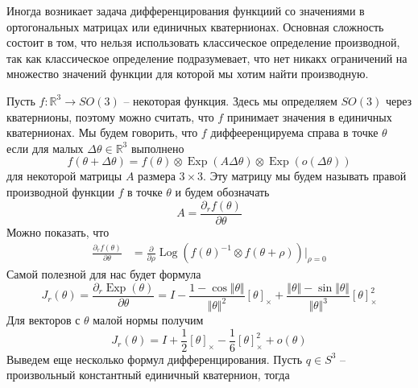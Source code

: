 \documentclass[12pt]{article}
\begin{document}
Иногда возникает задача дифференцирования функциий со значениями в ортогональных
матрицах или единичных кватернионах. Основная сложность состоит в том, что нельзя
использовать классическое определение производной, так как классическое определение
подразумевает, что нет никакх ограничений на множество значений функции для которой
мы хотим найти производную.

Пусть $f:\mathbb{R}^3\to SO(3)$ -- некоторая функция. Здесь мы определяем
$SO(3)$ через кватернионы, поэтому можно считать, что $f$ принимает значения в единичных
кватернионах. Мы будем говорить, что $f$ диффееренцируема справа в точке $\theta$ если
для малых $\Delta \theta\in\mathbb{R}^3$ выполнено
\begin{equation}
    f(\theta+\Delta\theta)=f(\theta)\otimes \operatorname{Exp}(A\Delta \theta)\otimes \operatorname{Exp}(o(\Delta\theta))
\end{equation}
для некоторой матрицы $A$ размера $3\times 3$. Эту матрицу мы будем называть правой производной функции $f$
в точке $\theta$ и будем обозначать
\begin{equation}
    A=\frac{\partial_r f(\theta)}{\partial \theta}
\end{equation}
Можно показать, что
\begin{equation}
    \begin{aligned}
        \frac{\partial_r f(\theta)}{\partial \theta}
         & =\frac{\partial}{\partial \rho}
        \operatorname{Log}(f(\theta)^{-1} \otimes f(\theta+\rho))\Biggl |_{\rho=0}
    \end{aligned}
\end{equation}
Самой полезной для нас будет формула
\begin{equation}
    J_r(\theta)
    =\frac{\partial_r \operatorname{Exp}(\theta)}{\partial \theta}
    =I-\frac{1-\cos\Vert\theta\Vert}{\Vert \theta\Vert^2}[\theta]_\times
    +\frac{\Vert\theta\Vert - \sin\Vert\theta\Vert}{\Vert\theta\Vert^3}[\theta]_\times^2
\end{equation}
Для векторов с $\theta$ малой нормы получим
\begin{equation}
    J_r(\theta)=I+\frac{1}{2}[\theta]_\times-\frac{1}{6}[\theta]_\times^2+o(\theta)
\end{equation}
Выведем еще несколько формул дифференцирования. Пусть $q\in S^3$ -- произвольный константный единичный кватернион, тогда
\end{document}
